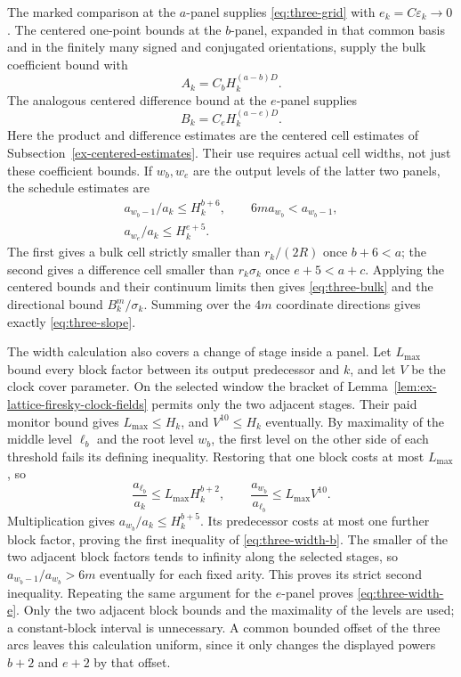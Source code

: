 The marked comparison at the $a$-panel supplies
\eqref{eq:three-grid} with $e_k=C\varepsilon_k\to0$.
The centered one-point bounds at the $b$-panel, expanded in that common
basis and in the finitely many signed and conjugated orientations, supply
the bulk coefficient bound with
\[
          A_k=C_bH_k^{(a-b)D}.
\]
The analogous centered difference bound at the $e$-panel supplies
\[
          B_k=C_eH_k^{(a-e)D}.
\]
Here the product and difference estimates are the centered cell estimates
of Subsection~\ref{ex-centered-estimates}. Their use requires actual cell
widths, not just these coefficient bounds. If $w_b,w_e$ are the output
levels of the latter two panels, the schedule estimates are
\begin{gather}
 a_{w_b-1}/a_k\le H_k^{b+6},\qquad
          6m a_{w_b}<a_{w_b-1},\label{eq:three-width-b}\\
 a_{w_e}/a_k\le H_k^{e+5}.\label{eq:three-width-e}
\end{gather}
The first gives a bulk cell strictly smaller than $r_k/(2R)$ once
$b+6<a$; the second gives a difference cell smaller than
$r_k\sigma_k$ once $e+5<a+c$. Applying the centered bounds and their
continuum limits then gives \eqref{eq:three-bulk} and the directional
bound $B_k^m/\sigma_k$. Summing over the $4m$ coordinate directions
gives exactly \eqref{eq:three-slope}.

The width calculation also covers a change of stage inside a panel.
Let $L_{\max}$ bound every block factor between its output predecessor
and $k$, and let $V$ be the clock cover parameter. On the selected
window the bracket of Lemma~\ref{lem:ex-lattice-firesky-clock-fields}
permits only the two adjacent stages. Their paid monitor bound gives
$L_{\max}\le H_k$, and $V^{10}\le H_k$ eventually.
By maximality of the middle level $\ell_b$ and the root level $w_b$,
the first level on the other side of each threshold fails its defining
inequality. Restoring that one block costs at most $L_{\max}$, so
\[
 \frac{a_{\ell_b}}{a_k}\le L_{\max}H_k^{b+2},\qquad
 \frac{a_{w_b}}{a_{\ell_b}}\le L_{\max}V^{10}.
\]
Multiplication gives $a_{w_b}/a_k\le H_k^{b+5}$. Its predecessor costs
at most one further block factor, proving the first inequality of
\eqref{eq:three-width-b}. The smaller of the two adjacent block factors
tends to infinity along the selected stages, so
$a_{w_b-1}/a_{w_b}>6m$ eventually for each fixed arity. This proves
its strict second inequality. Repeating the same argument for the
$e$-panel proves \eqref{eq:three-width-e}. Only the two adjacent block
bounds and the maximality of the levels are used; a constant-block
interval is unnecessary. A common bounded offset of the three arcs
leaves this calculation uniform, since it only changes the displayed
powers $b+2$ and $e+2$ by that offset.

